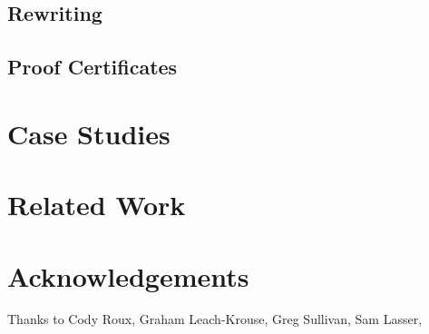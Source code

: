 \documentclass{article}%
\begin{document}
\subsection{Rewriting}
\subsection{Proof Certificates}

\section{Case Studies}


\section{Related Work}

\section{Acknowledgements}
Thanks to Cody Roux, Graham Leach-Krouse, Greg Sullivan, Sam Lasser, 




\end{document}
